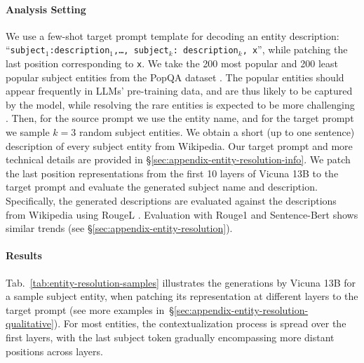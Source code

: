 \documentclass{article}
\theoremstyle{plain}
\theoremstyle{definition}
\theoremstyle{remark}
\begin{document}
\paragraph{Analysis Setting}
We use a few-shot target prompt template for decoding an entity description: ``\texttt{subject$_1$:\;description$_1$,\;\ldots, subject$_k$: description$_k$, x}'', while patching the last position corresponding to \texttt{x}. 
We take the 200 most popular and 200 least popular subject entities from the PopQA dataset \cite{mallen-etal-2023-trust}. The popular entities should appear frequently in LLMs' pre-training data, and are thus likely to be captured by the model, while resolving the rare entities is expected to be more challenging \citep{kandpal2023large,mallen-etal-2023-trust}.
Then, for the source prompt we use the entity name, and for the target prompt we sample $k=3$ random subject entities. We obtain a short (up to one sentence) description of every subject entity from Wikipedia. Our target prompt and more technical details are provided in \S\ref{sec:appendix-entity-resolution-info}.
We patch the last position representations from the first 10 layers of Vicuna 13B to the target prompt and evaluate the generated subject name and description. Specifically, the generated descriptions are evaluated against the descriptions from Wikipedia using RougeL \cite{lin-2004-rouge}. Evaluation with Rouge1 \cite{lin-2004-rouge} and Sentence-Bert \citep{reimers-2019-sentence-bert} shows similar trends (see \S\ref{sec:appendix-entity-resolution}). 


\paragraph{Results}

Tab.~\ref{tab:entity-resolution-samples} illustrates the generations by Vicuna 13B for a sample subject entity, when patching its representation at different layers to the target prompt (see more examples in~\S\ref{sec:appendix-entity-resolution-qualitative}). For most entities, the contextualization process is spread over the first layers, with the last subject token gradually encompassing more distant positions across layers.
\end{document}
